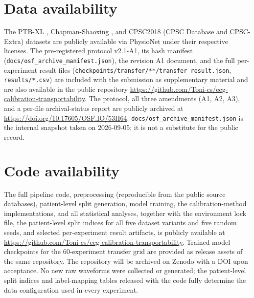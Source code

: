 \documentclass[review,12pt,nonatbib]{elsarticle}
\begin{document}
\section*{Data availability}
The PTB-XL \cite{wagner2020ptbxl}, Chapman-Shaoxing
\cite{zheng2022ecgarrhythmia}, and CPSC2018 (CPSC Database and CPSC-Extra)
\cite{liu2018cpsc,physionet2020cpsc} datasets are publicly
available via PhysioNet under their respective licenses. The
pre-registered protocol v2.1-A1, its hash manifest
(\texttt{docs/osf\_archive\_manifest.json}), the revision A1 document,
and the full per-experiment result files
(\texttt{checkpoints/transfer/**/}\allowbreak\texttt{transfer\_result.json},
\texttt{results/*.csv}) are included with the submission as
supplementary material and are also available in the public repository
\url{https://github.com/Toni-cs/ecg-calibration-transportability}.
The protocol, all three amendments
(A1, A2, A3), and a per-file archival-status report are publicly archived at
\url{https://doi.org/10.17605/OSF.IO/53H64}. \texttt{docs/osf\_archive\_manifest.json} is the internal
snapshot taken on 2026-09-05; it is not a substitute for the public record.

\section*{Code availability}
The full pipeline code, preprocessing (reproducible from the
public source databases), patient-level split generation, model
training, the calibration-method implementations, and all statistical
analyses, together with the environment lock file, the patient-level
split indices for all five dataset variants and five random seeds, and
selected per-experiment result artifacts, is publicly available at
\url{https://github.com/Toni-cs/ecg-calibration-transportability}.
Trained model checkpoints for the 60-experiment transfer grid are
provided as release assets of the same repository. The repository will
be archived on Zenodo with a DOI upon acceptance. No new raw
waveforms were collected or generated; the patient-level split
indices and label-mapping tables released with the code fully
determine the data configuration used in every experiment.
\end{document}
